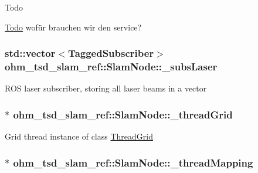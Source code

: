 \begin{DoxyRefDesc}{Todo}
\item[\hyperlink{todo__todo000014}{Todo}]wofür brauchen wir den service? \end{DoxyRefDesc}
\hypertarget{classohm__tsd__slam__ref_1_1SlamNode_a65b1147fbe5c773c55a7e2b640b77d01}{
\subsubsection[{\-\_\-subs\-Laser}]{\setlength{\rightskip}{0pt plus 5cm}std\-::vector$<${\bf Tagged\-Subscriber}$>$ ohm\-\_\-tsd\-\_\-slam\-\_\-ref\-::\-Slam\-Node\-::\-\_\-subs\-Laser\hspace{0.3cm}{\ttfamily [private]}}}\label{classohm__tsd__slam__ref_1_1SlamNode_a65b1147fbe5c773c55a7e2b640b77d01}
R\-O\-S laser subscriber, storing all laser beams in a vector \hypertarget{classohm__tsd__slam__ref_1_1SlamNode_aa8894ed7f5c7413c1cfe5da64e3ac5b5}{
\subsubsection[{\-\_\-thread\-Grid}]{$\ast$ ohm\-\_\-tsd\-\_\-slam\-\_\-ref\-::\-Slam\-Node\-::\-\_\-thread\-Grid\hspace{0.3cm}{\ttfamily [private]}}}\label{classohm__tsd__slam__ref_1_1SlamNode_aa8894ed7f5c7413c1cfe5da64e3ac5b5}
Grid thread instance of class \hyperlink{classohm__tsd__slam__ref_1_1ThreadGrid}{Thread\-Grid} \hypertarget{classohm__tsd__slam__ref_1_1SlamNode_afdc6f1e42ee4910090dd49e84aa3cd82}{
\subsubsection[{\-\_\-thread\-Mapping}]{$\ast$ ohm\-\_\-tsd\-\_\-slam\-\_\-ref\-::\-Slam\-Node\-::\-\_\-thread\-Mapping\hspace{0.3cm}{\ttfamily [private]}}}\label{classohm__tsd__slam__ref_1_1SlamNode_afdc6f1e42ee4910090dd49e84aa3cd82}
